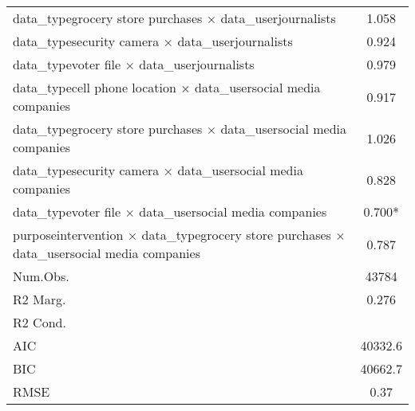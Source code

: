 \begin{table}
\begin{tabular}[t]{lc}
data\_typegrocery store purchases × data\_userjournalists & \num{1.058}\\
data\_typesecurity camera × data\_userjournalists & \num{0.924}\\
data\_typevoter file × data\_userjournalists & \num{0.979}\\
data\_typecell phone location × data\_usersocial media companies & \num{0.917}\\
data\_typegrocery store purchases × data\_usersocial media companies & \num{1.026}\\
data\_typesecurity camera × data\_usersocial media companies & \num{0.828}\\
data\_typevoter file × data\_usersocial media companies & \num{0.700}*\\
purposeintervention × data\_typegrocery store purchases × data\_usersocial media companies & \num{0.787}\\
\midrule
Num.Obs. & \num{43784}\\
R2 Marg. & \num{0.276}\\
R2 Cond. & \\
AIC & \num{40332.6}\\
BIC & \num{40662.7}\\
RMSE & \num{0.37}\\
\bottomrule
\end{tabular}
\end{table}
